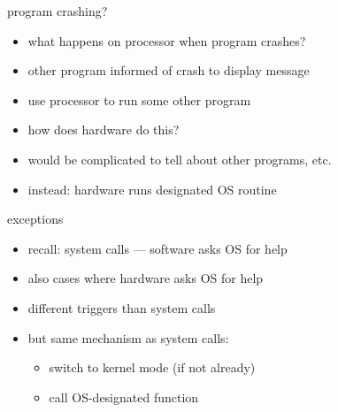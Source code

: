 \begin{frame}{program crashing?}
\begin{itemize}
\item what happens on processor when program crashes?
\vspace{.5cm}
\item other program informed of crash to display message
\item use processor to run some other program
\vspace{.5cm}
\item<2-> how does hardware do this?
\item<2-> would be complicated to tell about other programs, etc.
\item<2-> instead: hardware runs designated OS routine
\end{itemize}
\end{frame}

\begin{frame}{exceptions}
\begin{itemize}
\item recall: system calls --- software asks OS for help
\vspace{.5cm}
\item also cases where hardware asks OS for help
\item different triggers than system calls
\item but same mechanism as system calls:
    \begin{itemize}
    \item switch to kernel mode (if not already)
    \item call OS-designated function
    \end{itemize}
\end{itemize}
\end{frame}
